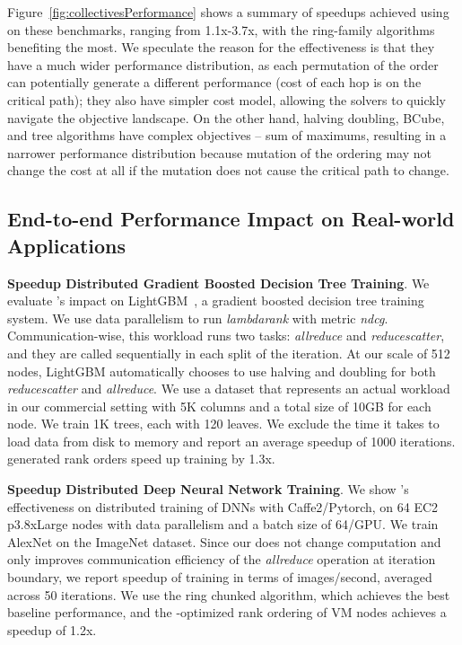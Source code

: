 Figure~\ref{fig:collectivesPerformance} shows a summary of speedups achieved using \cmpi on these benchmarks, ranging from 1.1x-3.7x, with the ring-family algorithms benefiting the most. We speculate the reason for the effectiveness is that they have a much wider performance distribution, as each permutation of the order can potentially generate a different performance (cost of each hop is on the critical path); they also have simpler cost model, allowing the solvers to quickly navigate the objective landscape. On the other hand, halving doubling, BCube, and tree algorithms have complex objectives -- sum of maximums, resulting in a narrower performance distribution because mutation of the ordering may not change the cost at all if the mutation does not cause the critical path to change. %

\subsection{End-to-end Performance Impact on Real-world Applications}
\noindent \textbf{Speedup Distributed Gradient Boosted Decision Tree Training}. We evaluate \cmpi{}'s impact on LightGBM~\cite{Ke2017LightGBMAH}, a gradient boosted decision tree training system. We use data parallelism to run \textit{lambdarank} with metric \textit{ndcg}. Communication-wise, this workload runs two tasks: \textit{allreduce} and \textit{reducescatter}, and %
they are called sequentially in each split of the iteration. At our scale of 512 nodes, LightGBM automatically chooses to use halving and doubling for both \textit{reducescatter} and \textit{allreduce}. We use a dataset that represents an actual workload in our commercial setting with 5K columns and a total size of 10GB for each node. We train 1K trees, each with 120 leaves. We exclude the time it takes to load data from disk to memory and report an average speedup of 1000 iterations. \cmpi generated rank orders speed up training by 1.3x.

\noindent \textbf{Speedup Distributed Deep Neural Network Training}. We show \cmpi{}'s effectiveness on distributed training of DNNs with Caffe2/Pytorch, on 64 EC2 p3.8xLarge nodes with data parallelism and a batch size of 64/GPU. We train AlexNet on the ImageNet dataset. Since our \cmpi{} does not change computation and only improves communication efficiency of the \textit{allreduce} operation at iteration boundary, we report speedup of training in terms of images/second, averaged across 50 iterations. We use the ring chunked algorithm, which achieves the best baseline performance, and the \cmpi{}-optimized rank ordering of VM nodes achieves a speedup of 1.2x.
